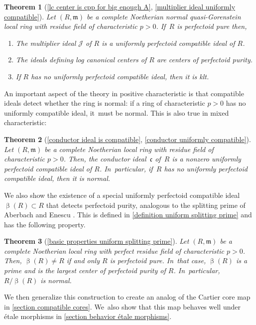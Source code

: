 \documentclass[11pt]{article}
\let\autoref\cref
\theoremstyle{plain}
\newtheorem{mainthm}{Theorem}
\theoremstyle{definition}
\numberwithin{equation}{theorem}
\newcommand{\fracc}{\mathfrak{c}}
\newcommand{\fram}{\mathfrak{m}}
\newcommand{\sJ}{\mathcal{J}}
\begin{document}
\begin{mainthm}[{\autoref{lc center is cpp for big enough A}, \autoref{multiplier ideal uniformly compatible}}]
Let $(R,\fram)$ be a complete Noetherian normal quasi-Gorenstein local ring with residue field of characteristic $p>0$. If~$R$ is perfectoid pure then,
\begin{enumerate}
\item The multiplier ideal $\sJ$ of $R$ is a uniformly perfectoid compatible ideal of $R$.
\item The ideals defining log canonical centers of $R$ are centers of perfectoid purity.
\item If $R$ has no uniformly perfectoid compatible ideal, then it is klt.
\end{enumerate}
\end{mainthm}

An important aspect of the theory in positive characteristic is that compatible ideals detect whether the ring is normal: if a ring of characteristic $p>0$ has no uniformly compatible ideal, it~must be normal. This is also true in mixed characteristic:

\begin{mainthm}[{\autoref{conductor ideal is compatible}, \autoref{conductor uniformly compatible}}]
Let $(R,\fram)$ be a complete Noetherian local ring with residue field of characteristic $p>0$. Then, the conductor ideal~$\fracc$ of~$R$ is a nonzero uniformly perfectoid compatible ideal of $R$. In~particular, if~$R$ has no uniformly perfectoid compatible ideal, then it is normal.
\end{mainthm}

We also show the existence of a special uniformly perfectoid compatible ideal $\upbeta(R)\subset R$ that detects perfectoid purity, analogous to the splitting prime of Aberbach and Enescu \cite{AberbachEnescuStructureOfFPure}. This is defined in \autoref{definition uniform splitting prime} and has the following property.

\begin{mainthm}[{\autoref{basic properties uniform splitting prime}}]
Let $(R,\fram)$ be a complete Noetherian local ring with perfect residue field of characteristic $p>0$. Then, $\upbeta(R)\neq R$ if and only $R$ is perfectoid pure. In~that case, $\upbeta(R)$ is a prime and is the largest center of perfectoid purity of $R$. In~particular, $R/\upbeta(R)$ is normal.
\end{mainthm}

We then generalize this construction to create an analog of the Cartier core map \cite{BadillaCespedesFInvariantsSRRings,BrosowskyCartierCoreMap,CarvajalFayolleTameRamificationCFPS} in \autoref{section compatible cores}. We~also show that this map behaves well under étale morphisms in \autoref{section behavior étale morphisms}.
\end{document}
